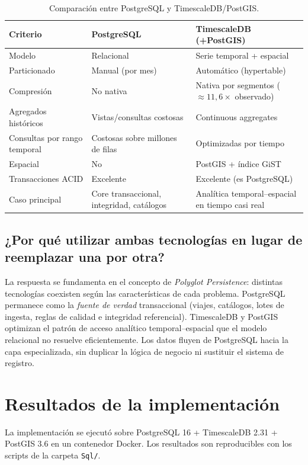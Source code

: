 \documentclass[11pt,a4paper]{article}
\begin{document}
\begin{table}[h]
\centering
\begin{tabular}{@{}p{4.2cm}p{4.6cm}p{4.8cm}@{}}
\toprule
\textbf{Criterio} & \textbf{PostgreSQL} & \textbf{TimescaleDB (+PostGIS)} \\
\midrule
Modelo & Relacional & Serie temporal + espacial \\
Particionado & Manual (por mes) & Automático (hypertable) \\
Compresión & No nativa & Nativa por segmentos ($\approx 11{,}6\times$ observado) \\
Agregados históricos & Vistas/consultas costosas & Continuous aggregates \\
Consultas por rango temporal & Costosas sobre millones de filas & Optimizadas por tiempo \\
Espacial & No & PostGIS + índice GiST \\
Transacciones ACID & Excelente & Excelente (es PostgreSQL) \\
Caso principal & Core transaccional, integridad, catálogos & Analítica temporal--espacial en tiempo casi real \\
\bottomrule
\end{tabular}
\caption{Comparación entre PostgreSQL y TimescaleDB/PostGIS.}
\end{table}

\subsection{¿Por qué utilizar ambas tecnologías en lugar de reemplazar una por otra?}
La respuesta se fundamenta en el concepto de \emph{Polyglot Persistence}: distintas tecnologías
coexisten según las características de cada problema. PostgreSQL permanece como la
\emph{fuente de verdad} transaccional (viajes, catálogos, lotes de ingesta, reglas de calidad e
integridad referencial). TimescaleDB y PostGIS optimizan el patrón de acceso analítico
temporal--espacial que el modelo relacional no resuelve eficientemente. Los datos fluyen de
PostgreSQL hacia la capa especializada, sin duplicar la lógica de negocio ni sustituir el
sistema de registro.

\section{Resultados de la implementación}

La implementación se ejecutó sobre PostgreSQL 16 + TimescaleDB 2.31 + PostGIS 3.6 en un
contenedor Docker. Los resultados son reproducibles con los scripts de la carpeta
\texttt{Sql/}.
\end{document}
